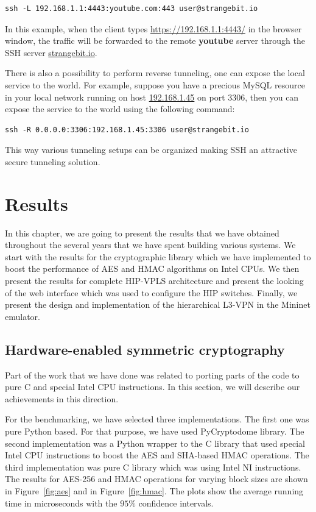 \begin{verbatim}
ssh -L 192.168.1.1:4443:youtube.com:443 user@strangebit.io
\end{verbatim}

In this example, when the client types \url{https://192.168.1.1:4443/} in the browser window,
the traffic will be forwarded to the remote {\bf youtube} server through the SSH server \url{strangebit.io}.

There is also a possibility to perform reverse tunneling, \ie one can expose the local service to the world.
For example, suppose you have a precious MySQL resource in your local network running on host \url{192.168.1.45} 
on port $3306$, then you can expose the service to the world using the following command:

\begin{verbatim}
ssh -R 0.0.0.0:3306:192.168.1.45:3306 user@strangebit.io
\end{verbatim}

This way various tunneling setups can be organized making SSH an attractive secure tunneling 
solution.

\chapter{Results}

In this chapter, we are going to present the results that we have obtained 
throughout the several years that we have spent building various systems. We start 
with the results for the cryptographic library which we have implemented to 
boost the performance of AES and HMAC algorithms on Intel CPUs. We then 
present the results for complete HIP-VPLS architecture and present the 
looking of the web interface which was used to configure the HIP switches.
Finally, we present the design and implementation of the hierarchical L3-VPN
in the Mininet emulator.  

\section{Hardware-enabled symmetric cryptography}

Part of the work that we have done was related to porting parts of the code to pure C 
and special Intel CPU instructions. In this section, we will describe our achievements 
in this direction. 

For the benchmarking, we have selected three implementations. The first one was pure 
Python based. For that purpose, we have used PyCryptodome library. The second implementation
was a Python wrapper to the C library that used special Intel CPU instructions to boost 
the AES and SHA-based HMAC operations. The third implementation was pure C library 
which was using Intel NI instructions. The results for AES-256 and HMAC operations 
for varying block sizes are shown in Figure~\ref{fig:aes} 
and in Figure~\ref{fig:hmac}. The plots show the average 
running time in microseconds with the $95\%$ confidence intervals. 

